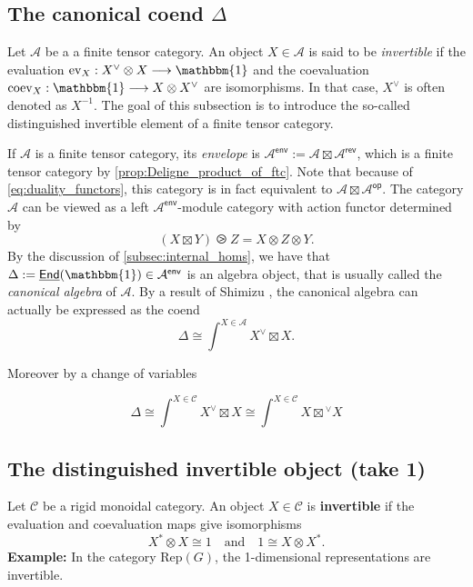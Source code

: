 \documentclass[11pt]{article}
\newcommand{\C}{\mathcal{C}}
\theoremstyle{definition}
\begin{document}
\subsection{The canonical coend $\Delta$}


Let $\mathcal{A}$ be a a finite tensor category. An object $X \in \mathcal{A}$ is said to be \emph{invertible} if the evaluation $\mathrm{ev}_X: X^\vee \otimes X \longrightarrow \mathbbm{1} $ and the coevaluation $\mathrm{coev}_X: \mathbbm{1} \longrightarrow X \otimes X^\vee$ are isomorphisms. In that case, $X^\vee$ is often denoted as $X^{-1}$. The goal of this subsection is to introduce the so-called distinguished invertible element of a finite tensor category.


If $\mathcal{A}$ is a finite tensor category, its \emph{envelope} is $\mathcal{A}^\mathsf{env} := \mathcal{A} \boxtimes \mathcal{A}^\mathsf{rev}$, which is a finite tensor category by  \cref{prop:Deligne_product_of_ftc}. Note that because of \eqref{eq:duality_functors}, this category is in fact equivalent to $\mathcal{A} \boxtimes \mathcal{A}^\mathsf{op}$. The category $\mathcal{A}$ can be viewed as a left $\mathcal{A}^\mathsf{env}$-module category with action functor determined by 
$$ (X \boxtimes Y) \ogreaterthan Z = X \otimes Z \otimes Y.  $$
By the discussion of \cref{subsec:internal_homs}, we have that $\Delta :=\underline{\mathsf{End}}(\mathbbm{1}) \in \mathcal{A}^\mathsf{env}$ is an algebra object, that is usually called the \emph{canonical algebra} of $\mathcal{A}$. By a result of Shimizu \cite[Lemma 4.4]{shimizuunimodular}, the canonical algebra can actually be expressed as the coend
\begin{equation}\label{eq:Delta_coend}
\Delta \cong \int^{X \in \mathcal{A}} X^\vee  \boxtimes X.   
\end{equation}

Moreover by a change of variables



$$ \Delta \cong \int^{X \in \C} X^\vee \boxtimes X \cong \int^{X \in \C} X \boxtimes {}^\vee X$$




\subsection{The distinguished invertible object (take 1)}



Let \( \mathcal{C} \) be a rigid monoidal category. An object \( X \in \mathcal{C} \) is \textbf{invertible} if the evaluation and coevaluation maps give isomorphisms
\[
X^* \otimes X \cong 1 \quad \text{and} \quad 1 \cong X \otimes X^*.
\]
\textbf{Example:} In the category \( \mathrm{Rep}(G) \), the 1-dimensional representations are invertible.
\end{document}
